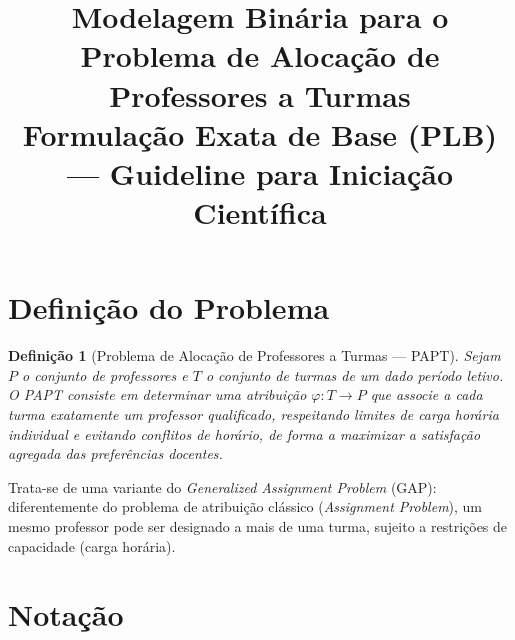 \documentclass[11pt,a4paper]{article}
\title{Modelagem Binária para o Problema de Alocação de Professores a Turmas\\
\large Formulação Exata de Base (PLB) --- Guideline para Iniciação Científica}
\author{}
\date{}
\newtheorem{definicao}{Definição}
\begin{document}
\maketitle

\section{Definição do Problema}

\begin{definicao}[Problema de Alocação de Professores a Turmas --- PAPT]
Sejam $P$ o conjunto de professores e $T$ o conjunto de turmas de um dado período letivo. O PAPT consiste em determinar uma atribuição $\varphi: T \rightarrow P$ que associe a cada turma exatamente um professor qualificado, respeitando limites de carga horária individual e evitando conflitos de horário, de forma a maximizar a satisfação agregada das preferências docentes.
\end{definicao}

Trata-se de uma variante do \emph{Generalized Assignment Problem} (GAP): diferentemente do problema de atribuição clássico (\emph{Assignment Problem}), um mesmo professor pode ser designado a mais de uma turma, sujeito a restrições de capacidade (carga horária).

\section{Notação}
\end{document}
